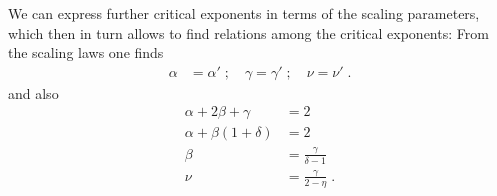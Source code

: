 We can express further critical exponents in terms of the scaling parameters, which then in turn allows to find relations among the 
critical exponents:
%
From the scaling laws one finds
\begin{align}
\alpha&=\alpha'\;;\quad
\gamma=\gamma'\;;\quad\nu=\nu'\;.
\end{align}
%
and also
%
\begin{align}
\alpha+2\beta+\gamma &=2\\
\alpha+\beta (1+\delta)&=2\\
\beta &=\frac{\gamma}{\delta-1}\\
\nu &=\frac{\gamma}{2-\eta}\;.
\end{align}
%

